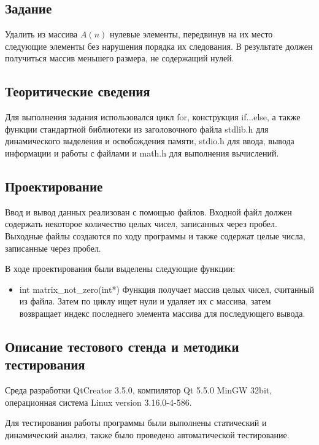 \documentclass[12pt,a4paper]{report}
\begin{document}
\subsection{Задание}

Удалить из массива $A(n)$ нулевые элементы, передвинув на их место следующие элементы без нарушения порядка их следования. В результате должен получиться массив меньшего размера, не содержащий нулей.

\subsection{Теоритические сведения}

Для выполнения задания использовался цикл for, конструкция if...else, а также функции стандартной библиотеки из заголовочного файла stdlib.h для динамического выделения и освобождения памяти, stdio.h для ввода, вывода информации и работы с файлами и math.h для выполнения вычислений.

\subsection{Проектирование}

Ввод и вывод данных реализован с помощью файлов. Входной файл должен содержать некоторое количество целых чисел, записанных через пробел. Выходные файлы создаются по ходу программы и также содержат целые числа, записанные через пробел.
 
В ходе проектирования были выделены следующие функции:

\begin{itemize}
 	
 	\item int matrix_not_zero(int*)
 	Функция получает массив целых чисел, считанный из файла. Затем по циклу ищет нули и удаляет их с массива, затем возвращает индекс последнего элемента массива для последующего вывода.
 	
\end{itemize}
	
\subsection{Описание тестового стенда и методики тестирования}
Среда разработки QtCreator 3.5.0, компилятор Qt 5.5.0 MinGW 32bit, операционная система Linux version 3.16.0-4-586.

Для тестирования работы программы были выполнены статический и динамический анализ, также было проведено автоматической тестирование.
\end{document}
